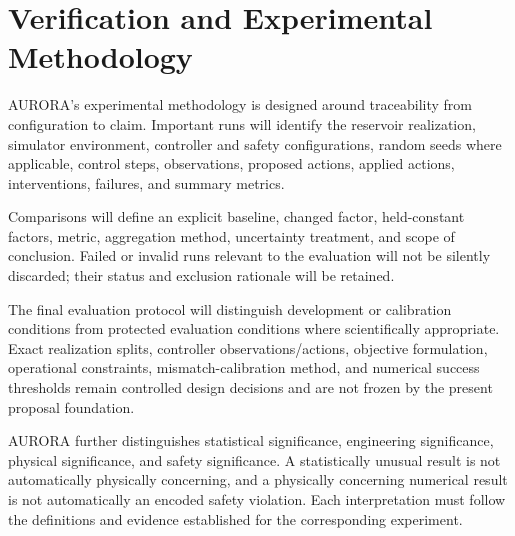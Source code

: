 \section{Verification and Experimental Methodology}
\label{sec:experiments}

AURORA's experimental methodology is designed around traceability from configuration
to claim. Important runs will identify the reservoir realization, simulator
environment, controller and safety configurations, random seeds where applicable,
control steps, observations, proposed actions, applied actions, interventions,
failures, and summary metrics.

Comparisons will define an explicit baseline, changed factor, held-constant factors,
metric, aggregation method, uncertainty treatment, and scope of conclusion. Failed or
invalid runs relevant to the evaluation will not be silently discarded; their status
and exclusion rationale will be retained.

The final evaluation protocol will distinguish development or calibration conditions
from protected evaluation conditions where scientifically appropriate. Exact
realization splits, controller observations/actions, objective formulation,
operational constraints, mismatch-calibration method, and numerical success
thresholds remain controlled design decisions and are not frozen by the present
proposal foundation.

AURORA further distinguishes statistical significance, engineering significance,
physical significance, and safety significance. A statistically unusual result is not
automatically physically concerning, and a physically concerning numerical result is
not automatically an encoded safety violation. Each interpretation must follow the
definitions and evidence established for the corresponding experiment.
